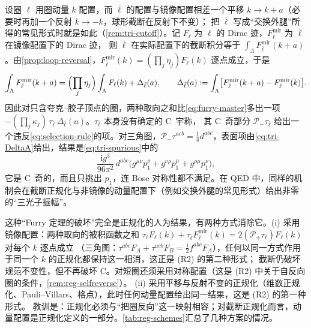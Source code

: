 \documentclass[UTF8,a4paper,11pt,fontset=fandol]{ctexart}
\theoremstyle{cplain}
\theoremstyle{cdefinition}
\theoremstyle{cremark}
\numberwithin{equation}{section}
\newcommand{\Pp}{\mathcal{P}_{+}}                    %
\newcommand{\Pm}{\mathcal{P}_{-}}                    %
\newcommand{\ii}{\mathrm{i}}                        %
\begin{document}
设圈 $\ell$ 用圈动量 $k$ 配置，而 $\bar\ell$ 的配置与镜像配置相差一个平移 $k\to k+a$（必要时再加一个反射 $k\to-k$，球形截断在反射下不变）；
把 $\bar\ell$ 写成“交换外腿”所得的常见形式时就是如此（\cref{rem:tri-cutoff}）。记 $F_\ell$ 为 $\ell$ 的 Dirac 迹，$F^{\mathrm{mir}}_{\bar\ell}$ 为 $\bar\ell$ 在镜像配置下的 Dirac 迹，
则 $\bar\ell$ 在实际配置下的截断积分等于 $\int_\Lambda F^{\mathrm{mir}}_{\bar\ell}(k+a)$。由\cref{prop:loop-reversal}，$F^{\mathrm{mir}}_{\bar\ell}(k)=(\prod_j\eta_j)F_\ell(k)$ 逐点成立，于是
\begin{equation}\label{eq:reg-surface}
\int_\Lambda F^{\mathrm{mir}}_{\bar\ell}(k+a)=\Bigl(\prod_j\eta_j\Bigr)\int_\Lambda F_\ell(k)+\Delta_{\bar\ell}(a),\qquad
\Delta_{\bar\ell}(a):=\int_\Lambda\bigl[F^{\mathrm{mir}}_{\bar\ell}(k+a)-F^{\mathrm{mir}}_{\bar\ell}(k)\bigr].
\end{equation}
因此对只含夸克--胶子顶点的圈，两种取向之和比\cref{eq:furry-master}多出一项 $-(\prod_j\kappa_j)\,\tau_{\bar\ell}\,\Delta_{\bar\ell}(a)$。$\tau_{\bar\ell}$ 本身没有确定的 C~宇称，
其 C~奇部分 $\Pm\tau_{\bar\ell}$ 给出一个违反\cref{eq:selection-rule}的项。对三角图，$\Pm\tau^{acb}=\frac14d^{abc}$，表面项由\cref{eq:tri-DeltaA}给出，结果是\cref{eq:tri-spurious}中的
\begin{equation}\label{eq:reg-spurious}
\frac{\ii g^3}{96\pi^2}\,d^{abc}\bigl(g^{\mu\nu}p_1^\rho+g^{\nu\rho}p_1^\mu+g^{\rho\mu}p_1^\nu\bigr),
\end{equation}
它是 C~奇的，而且只挑出 $p_1$，连 Bose 对称性都不满足。在 QED 中，同样的机制会在截断正规化与非镜像的动量配置下（例如交换外腿的常见形式）给出非零的“三光子振幅”。

这种“Furry 定理的破坏”完全是正规化的人为结果，有两种方式消除它。(i) 采用镜像配置：两种取向的被积函数之和 $\tau_\ell F_\ell(k)+\tau_{\bar\ell}F^{\mathrm{mir}}_{\bar\ell}(k)=2(\Pp\tau_\ell)F_\ell(k)$ 对每个 $k$ 逐点成立
（三角图：$\tau^{abc}F_A+\tau^{acb}F_B=\frac{\ii}{2}f^{abc}F_A$），任何以同一方式作用于同一个 $k$ 的正规化都保持这一相消，这正是 (R2) 的第二种形式；
截断仍破坏规范不变性，但不再破坏 C。对短圈还须采用对称配置（这是 (R2) 中关于自反向圈的条件，\cref{rem:reg-selfreverse}）。
(ii) 采用平移与反射不变的正规化（维数正规化、Pauli--Villars、格点），此时任何动量配置给出同一结果，这是 (R2) 的第一种形式。
教训是：正规化必须与“把圈反向”这一映射相容；对截断正规化而言，动量配置是正规化定义的一部分。\cref{tab:reg-schemes}汇总了几种方案的情况。
\end{document}
